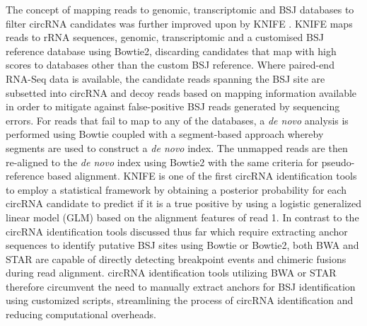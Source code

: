 \documentclass[pdflatex,sn-mathphys-num]{sn-jnl}
\begin{document}
The concept of mapping reads to genomic, transcriptomic and BSJ databases to filter circRNA candidates was further improved upon by KNIFE \cite{KNIFE}. KNIFE maps reads to rRNA sequences, genomic, transcriptomic and a customised BSJ reference database using Bowtie2, discarding candidates that map with high scores to databases other than the custom BSJ reference. Where paired-end RNA-Seq data is available, the candidate reads spanning the BSJ site are subsetted into circRNA and decoy reads based on mapping information available in order to mitigate against false-positive BSJ reads generated by sequencing errors. For reads that fail to map to any of the databases, a \textit{de novo} analysis is performed using Bowtie coupled with a segment-based approach whereby segments are used to construct a \textit{de novo} index. The unmapped reads are then re-aligned to the \textit{de novo} index using Bowtie2 with the same criteria for pseudo-reference based alignment. KNIFE is one of the first circRNA identification tools to employ a statistical framework by obtaining a posterior probability for each circRNA candidate to predict if it is a true positive by using a logistic generalized linear model (GLM) based on the alignment features of read 1. In contrast to the circRNA identification tools discussed thus far which require extracting anchor sequences to identify putative BSJ sites using Bowtie or Bowtie2, both BWA and STAR are capable of directly detecting breakpoint events and chimeric fusions during read alignment. circRNA identification tools utilizing BWA or STAR therefore circumvent the need to manually extract anchors for BSJ identification using customized scripts, streamlining the process of circRNA identification and reducing computational overheads. \par 
\end{document}
